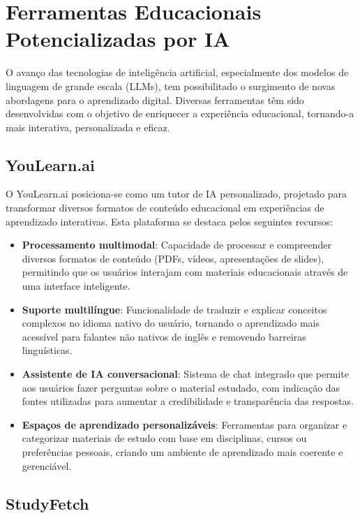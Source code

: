 \documentclass[tcc,capa]{texufpel}
\begin{document}
\section{Ferramentas Educacionais Potencializadas por IA}

O avanço das tecnologias de inteligência artificial, especialmente dos modelos de linguagem de grande escala (LLMs), tem possibilitado o surgimento de novas abordagens para o aprendizado digital. Diversas ferramentas têm sido desenvolvidas com o objetivo de enriquecer a experiência educacional, tornando-a mais interativa, personalizada e eficaz.

\subsection{YouLearn.ai}

O YouLearn.ai posiciona-se como um tutor de IA personalizado, projetado para transformar diversos formatos de conteúdo educacional em experiências de aprendizado interativas. Esta plataforma se destaca pelos seguintes recursos:

\begin{itemize}
    \item \textbf{Processamento multimodal}: Capacidade de processar e compreender diversos formatos de conteúdo (PDFs, vídeos, apresentações de slides), permitindo que os usuários interajam com materiais educacionais através de uma interface inteligente.
    
    \item \textbf{Suporte multilíngue}: Funcionalidade de traduzir e explicar conceitos complexos no idioma nativo do usuário, tornando o aprendizado mais acessível para falantes não nativos de inglês e removendo barreiras linguísticas.
    
    \item \textbf{Assistente de IA conversacional}: Sistema de chat integrado que permite aos usuários fazer perguntas sobre o material estudado, com indicação das fontes utilizadas para aumentar a credibilidade e transparência das respostas.
    
    \item \textbf{Espaços de aprendizado personalizáveis}: Ferramentas para organizar e categorizar materiais de estudo com base em disciplinas, cursos ou preferências pessoais, criando um ambiente de aprendizado mais coerente e gerenciável.
\end{itemize}

\subsection{StudyFetch}
\end{document}
